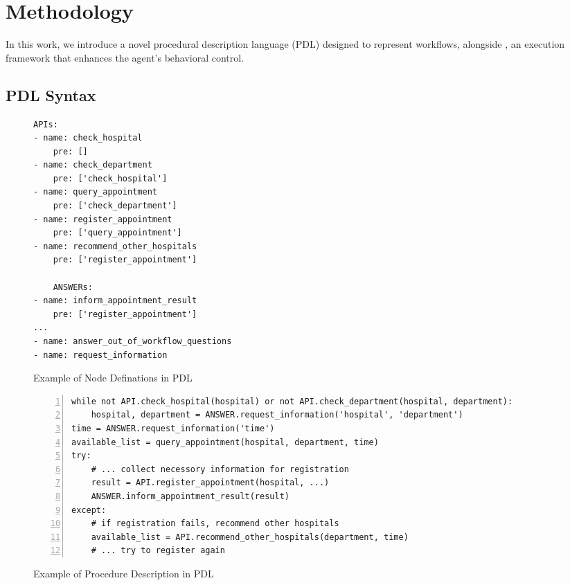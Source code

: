\tableDatasetStat
\tableDatasetCompare


\section{Methodology} \label{sec:method}
In this work, we introduce a novel procedural description language (PDL) designed to represent workflows, alongside \model, an execution framework that enhances the agent's behavioral control. 

\subsection{PDL Syntax} \label{subsec:pdl-syntax}
\begin{figure}[!t]
\begin{lstlisting}[language={}, basicstyle=\small\ttfamily] 
APIs:
- name: check_hospital
    pre: []
- name: check_department
    pre: ['check_hospital']
- name: query_appointment
    pre: ['check_department']
- name: register_appointment
    pre: ['query_appointment']
- name: recommend_other_hospitals
    pre: ['register_appointment']

    ANSWERs:
- name: inform_appointment_result
    pre: ['register_appointment']
...
- name: answer_out_of_workflow_questions
- name: request_information
\end{lstlisting}
\vspace{-0.2cm}
\caption{Example of Node Definations in PDL} \label{fig:node_example}
\vspace{-0.2cm}
\end{figure}

\begin{figure*}[!t]
\begin{lstlisting}[language={}, basicstyle=\small\ttfamily, numbers=left] 
while not API.check_hospital(hospital) or not API.check_department(hospital, department):
    hospital, department = ANSWER.request_information('hospital', 'department')
time = ANSWER.request_information('time')
available_list = query_appointment(hospital, department, time)
try:
    # ... collect necessory information for registration
    result = API.register_appointment(hospital, ...)
    ANSWER.inform_appointment_result(result)
except:
    # if registration fails, recommend other hospitals
    available_list = API.recommend_other_hospitals(department, time)
    # ... try to register again
\end{lstlisting}
\vspace{-0.2cm}
\caption{Example of Procedure Description in PDL} \label{fig:procedure_example}
\vspace{-0.2cm}
\end{figure*}

